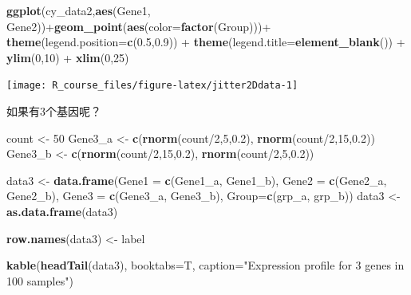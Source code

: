 \documentclass[]{article}
\newenvironment{Shaded}{\begin{snugshade}}{\end{snugshade}}
\newcommand{\KeywordTok}[1]{\textcolor[rgb]{0.13,0.29,0.53}{\textbf{{#1}}}}
\newcommand{\DataTypeTok}[1]{\textcolor[rgb]{0.13,0.29,0.53}{{#1}}}
\newcommand{\DecValTok}[1]{\textcolor[rgb]{0.00,0.00,0.81}{{#1}}}
\newcommand{\FloatTok}[1]{\textcolor[rgb]{0.00,0.00,0.81}{{#1}}}
\newcommand{\StringTok}[1]{\textcolor[rgb]{0.31,0.60,0.02}{{#1}}}
\newcommand{\NormalTok}[1]{{#1}}
\numberwithin{figure}{section}
\numberwithin{table}{section}
\theoremstyle{definition}
\theoremstyle{definition}
\theoremstyle{definition}
\theoremstyle{remark}
\begin{document}
\begin{Shaded}
\begin{Highlighting}[]
\KeywordTok{ggplot}\NormalTok{(cy_data2,}\KeywordTok{aes}\NormalTok{(Gene1, Gene2))+}\KeywordTok{geom_point}\NormalTok{(}\KeywordTok{aes}\NormalTok{(}\DataTypeTok{color=}\KeywordTok{factor}\NormalTok{(Group)))+}
\StringTok{    }\KeywordTok{theme}\NormalTok{(}\DataTypeTok{legend.position=}\KeywordTok{c}\NormalTok{(}\FloatTok{0.5}\NormalTok{,}\FloatTok{0.9}\NormalTok{)) +}\StringTok{ }\KeywordTok{theme}\NormalTok{(}\DataTypeTok{legend.title=}\KeywordTok{element_blank}\NormalTok{()) +}\StringTok{ }
\StringTok{    }\KeywordTok{ylim}\NormalTok{(}\DecValTok{0}\NormalTok{,}\DecValTok{10}\NormalTok{) +}\StringTok{ }\KeywordTok{xlim}\NormalTok{(}\DecValTok{0}\NormalTok{,}\DecValTok{25}\NormalTok{)}
\end{Highlighting}
\end{Shaded}

\begin{center}\texttt{[image: R\_course\_files/figure-latex/jitter2Ddata-1]} \end{center}

如果有3个基因呢？

\begin{Shaded}
\begin{Highlighting}[]
\NormalTok{count <-}\StringTok{ }\DecValTok{50}
\NormalTok{Gene3_a <-}\StringTok{ }\KeywordTok{c}\NormalTok{(}\KeywordTok{rnorm}\NormalTok{(count/}\DecValTok{2}\NormalTok{,}\DecValTok{5}\NormalTok{,}\FloatTok{0.2}\NormalTok{), }\KeywordTok{rnorm}\NormalTok{(count/}\DecValTok{2}\NormalTok{,}\DecValTok{15}\NormalTok{,}\FloatTok{0.2}\NormalTok{))}
\NormalTok{Gene3_b <-}\StringTok{ }\KeywordTok{c}\NormalTok{(}\KeywordTok{rnorm}\NormalTok{(count/}\DecValTok{2}\NormalTok{,}\DecValTok{15}\NormalTok{,}\FloatTok{0.2}\NormalTok{), }\KeywordTok{rnorm}\NormalTok{(count/}\DecValTok{2}\NormalTok{,}\DecValTok{5}\NormalTok{,}\FloatTok{0.2}\NormalTok{))}

\NormalTok{data3 <-}\StringTok{ }\KeywordTok{data.frame}\NormalTok{(}\DataTypeTok{Gene1 =} \KeywordTok{c}\NormalTok{(Gene1_a, Gene1_b), }\DataTypeTok{Gene2 =} \KeywordTok{c}\NormalTok{(Gene2_a, Gene2_b), }
        \DataTypeTok{Gene3 =} \KeywordTok{c}\NormalTok{(Gene3_a, Gene3_b), }\DataTypeTok{Group=}\KeywordTok{c}\NormalTok{(grp_a, grp_b))}
\NormalTok{data3 <-}\StringTok{ }\KeywordTok{as.data.frame}\NormalTok{(data3)}

\KeywordTok{row.names}\NormalTok{(data3) <-}\StringTok{ }\NormalTok{label}

\KeywordTok{kable}\NormalTok{(}\KeywordTok{headTail}\NormalTok{(data3), }\DataTypeTok{booktabs=}\NormalTok{T, }\DataTypeTok{caption=}\StringTok{"Expression profile for 3 genes in 100 samples"}\NormalTok{)}
\end{Highlighting}
\end{Shaded}
\end{document}
